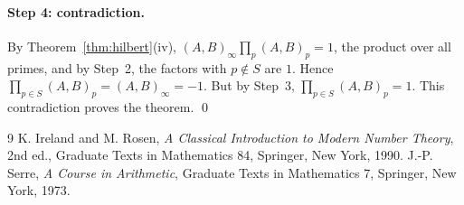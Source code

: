 \documentclass[11pt]{article}
\begin{document}
\paragraph{Step 4: contradiction.} By Theorem~\ref{thm:hilbert}(iv), $(A,B)_\infty\prod_p(A,B)_p=1$, the product over all primes, and by Step~2, the factors with $p\notin S$ are $1$. Hence $\prod_{p\in S}(A,B)_p=(A,B)_\infty=-1$. But by Step~3, $\prod_{p\in S}(A,B)_p=1$. This contradiction proves the theorem.
\qed

\begin{thebibliography}{9}
 K. Ireland and M. Rosen, \emph{A Classical Introduction to Modern Number Theory}, 2nd ed., Graduate Texts in Mathematics 84, Springer, New York, 1990.
 J.-P. Serre, \emph{A Course in Arithmetic}, Graduate Texts in Mathematics 7, Springer, New York, 1973.
\end{thebibliography}
\end{document}
